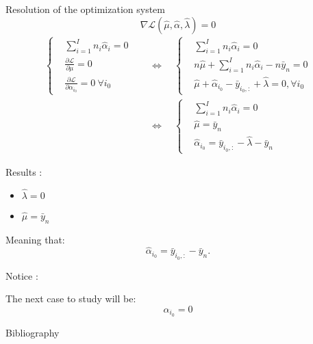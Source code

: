 \documentclass[unknownkeysallowed]{beamer}
\begin{document}
\begin{frame}{Resolution of the optimization system}
\[\nabla \mathcal{L}(\hat\mu,\hat\alpha,\hat\lambda)=0\]
\[
\begin{aligned}
\begin{cases}
&  \sum\limits_{i=1}^{I}n_i \hat{\alpha}_i=0 \\
&  \frac{\partial \mathcal{L}}{\partial \mu}=0 \\
&  \frac{\partial \mathcal{L}}{\partial \alpha_{i_0}}=0\ \forall i_0 
\end{cases}
\quad&\Longleftrightarrow\quad
\begin{cases}
&  \sum\limits_{i=1}^{I}n_i\hat{\alpha}_i=0 \\
&  n\hat{\mu}+ \sum\limits_{i=1}^I n_i\hat{\alpha}_i-n\bar{y}_n=0 \\
&  \hat{\mu}+\hat{\alpha}_{i_0}-\bar{y}_{i_0,:}+\hat{\lambda} = 0, \forall{i_0} 
\end{cases}\\
& \Longleftrightarrow\quad
\begin{cases}
& \sum\limits_{i=1}^{I}n_i \hat{\alpha}_i=0 \\
& \hat{\mu}=\bar{y}_n \\
& \hat{\alpha}_{i_0} = \bar{y}_{i_0,:}-\hat{\lambda}-\bar{y}_n

\end{cases}
\end{aligned}
\]

\end{frame}


\begin{frame}

\begin{alertblock}{Results : }
    \begin{itemize}
        \item $\hat{\lambda}=0$
        \item $\hat{\mu}=\bar{y}_n$
    \end{itemize}
Meaning that:
\[\hat{\alpha}_{i_0}=\bar{y}_{i_0,:}- \bar{y}_{n}.\]
\end{alertblock}


\begin{alertblock}{Notice : }

The next case to study will be: $$ \alpha_{i_0}=0$$

\end{alertblock}

\end{frame}


\begin{frame}{Bibliography}
\nocite{*}
\printbibliography
\end{frame}
\end{document}
